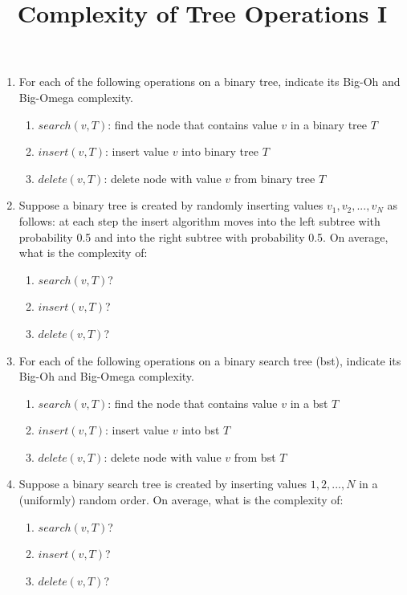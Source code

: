 \documentclass{article}
\title{Complexity of Tree Operations I}
\begin{document}
\maketitle

\begin{enumerate}
\item For each of the following operations on a binary tree, indicate
  its Big-Oh and Big-Omega complexity.
  \begin{enumerate}
  \item $search(v, T)$: find the node that contains value $v$ in a binary tree $T$
  \item $insert(v, T)$: insert value $v$ into binary tree $T$
  \item $delete(v, T)$: delete node with value $v$ from binary tree $T$
  \end{enumerate}
\item Suppose a binary tree is created by randomly inserting values
  $v_1, v_2, ..., v_N$ as follows: at each step the insert algorithm
  moves into the left subtree with probability 0.5 and into the right
  subtree with probability 0.5. On average, what is the complexity of:
  \begin{enumerate}
  \item $search(v, T)$?
  \item $insert(v, T)$?
  \item $delete(v, T)$?
  \end{enumerate}
\item For each of the following operations on a binary search tree (bst),
  indicate its Big-Oh and Big-Omega complexity.
  \begin{enumerate}
  \item $search(v, T)$: find the node that contains value $v$ in a bst $T$
  \item $insert(v, T)$: insert value $v$ into bst $T$
  \item $delete(v, T)$: delete node with value $v$ from bst $T$
  \end{enumerate}
\item Suppose a binary search tree is created by inserting values
  $1, 2, ..., N$ in a (uniformly) random order. On average, what is
  the complexity of:
  \begin{enumerate}
  \item $search(v, T)$?
  \item $insert(v, T)$?
  \item $delete(v, T)$?
  \end{enumerate}  
\end{enumerate}
\end{document}
